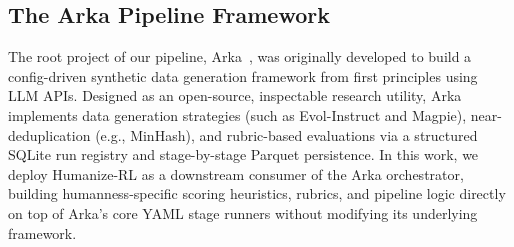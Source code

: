 \documentclass{article}
\begin{document}
\subsection{The Arka Pipeline Framework}
The root project of our pipeline, Arka~\citep{arka}, was originally developed to build a config-driven synthetic data generation framework from first principles using LLM APIs. Designed as an open-source, inspectable research utility, Arka implements data generation strategies (such as Evol-Instruct and Magpie), near-deduplication (e.g., MinHash), and rubric-based evaluations via a structured SQLite run registry and stage-by-stage Parquet persistence. In this work, we deploy Humanize-RL as a downstream consumer of the Arka orchestrator, building humanness-specific scoring heuristics, rubrics, and pipeline logic directly on top of Arka's core YAML stage runners without modifying its underlying framework.
\end{document}
